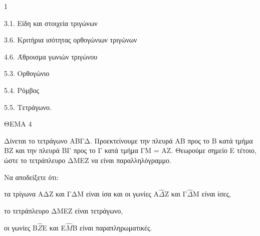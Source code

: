 \begin{ylh}{1}
    \item 3.1. Είδη και στοιχεία τριγώνων
    \item 3.6. Κριτήρια ισότητας ορθογώνιων τριγώνων
    \item 4.6. Άθροισμα γωνιών τριγώνου
    \item 5.3. Ορθογώνιο
    \item 5.4. Ρόμβος
    \item 5.5. Τετράγωνο.
\end{ylh}

ΘΕΜΑ 4

Δίνεται το τετράγωνο ΑΒΓΔ. Προεκτείνουμε την πλευρά ΑΒ προς το Β κατά τμήμα ΒΖ και την πλευρά ΒΓ προς το Γ κατά τμήμα ΓΜ = ΑΖ. Θεωρούμε σημείο Ε τέτοιο, ώστε το τετράπλευρο ΔΜΕΖ να είναι παραλληλόγραμμο.

Να αποδείξετε ότι:

\begin{alist}
\item τα τρίγωνα ΑΔΖ και ΓΔΜ είναι ίσα και οι γωνίες Α$\widehat{\Delta}$Ζ και Γ$\widehat{\Delta}$Μ είναι ίσες, 

\item το τετράπλευρο ΔΜΕΖ είναι τετράγωνο, 

\item οι γωνίες Β$\widehat{Ζ}$Ε και Ε$\widehat{Μ}$Β είναι παραπληρωματικές. 


\begin{center}
\end{center}
\end{alist}
